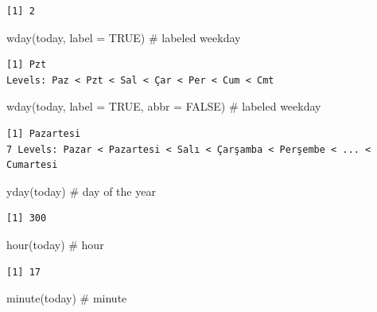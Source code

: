 \documentclass[
  letterpaper,
  DIV=11,
  numbers=noendperiod]{scrreprt}
\newenvironment{Shaded}{\begin{snugshade}}{\end{snugshade}}
\newcommand{\AttributeTok}[1]{\textcolor[rgb]{0.40,0.45,0.13}{#1}}
\newcommand{\CommentTok}[1]{\textcolor[rgb]{0.37,0.37,0.37}{#1}}
\newcommand{\ConstantTok}[1]{\textcolor[rgb]{0.56,0.35,0.01}{#1}}
\newcommand{\FunctionTok}[1]{\textcolor[rgb]{0.28,0.35,0.67}{#1}}
\newcommand{\NormalTok}[1]{\textcolor[rgb]{0.00,0.23,0.31}{#1}}
\begin{document}
\begin{verbatim}
[1] 2
\end{verbatim}

\begin{Shaded}
\begin{Highlighting}[]
\FunctionTok{wday}\NormalTok{(today, }\AttributeTok{label =} \ConstantTok{TRUE}\NormalTok{) }\CommentTok{\# labeled weekday}
\end{Highlighting}
\end{Shaded}

\begin{verbatim}
[1] Pzt
Levels: Paz < Pzt < Sal < Çar < Per < Cum < Cmt
\end{verbatim}

\begin{Shaded}
\begin{Highlighting}[]
\FunctionTok{wday}\NormalTok{(today, }\AttributeTok{label =} \ConstantTok{TRUE}\NormalTok{, }\AttributeTok{abbr =} \ConstantTok{FALSE}\NormalTok{) }\CommentTok{\# labeled weekday}
\end{Highlighting}
\end{Shaded}

\begin{verbatim}
[1] Pazartesi
7 Levels: Pazar < Pazartesi < Salı < Çarşamba < Perşembe < ... < Cumartesi
\end{verbatim}

\begin{Shaded}
\begin{Highlighting}[]
\FunctionTok{yday}\NormalTok{(today) }\CommentTok{\# day of the year}
\end{Highlighting}
\end{Shaded}

\begin{verbatim}
[1] 300
\end{verbatim}

\begin{Shaded}
\begin{Highlighting}[]
\FunctionTok{hour}\NormalTok{(today) }\CommentTok{\# hour}
\end{Highlighting}
\end{Shaded}

\begin{verbatim}
[1] 17
\end{verbatim}

\begin{Shaded}
\begin{Highlighting}[]
\FunctionTok{minute}\NormalTok{(today) }\CommentTok{\# minute}
\end{Highlighting}
\end{Shaded}
\end{document}
